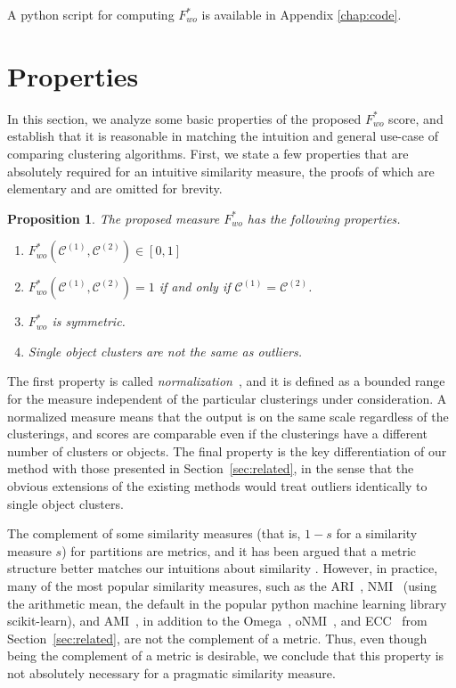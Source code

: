 \documentclass[review,los,12pt]{ryethesis}
\newtheorem{proposition}[theorem]{Proposition}
\newcommand\cCone{\mathcal{C}^{(1)}}
\newcommand\cCtwo{\mathcal{C}^{(2)}}
\begin{document}
A python script for computing $F^*_{wo}$ is available in Appendix \ref{chap:code}.

\section{Properties}
In this section, we analyze some basic properties of the proposed $F^*_{wo}$ score, and establish that it is reasonable in matching the intuition and general use-case of comparing clustering algorithms.
First, we state a few properties that are absolutely required for an intuitive similarity measure, the proofs of which are elementary and are omitted for brevity.

\begin{proposition}
    The proposed measure $F^*_{wo}$ has the following properties.
    \begin{enumerate}
        \item $F^*_{wo}(\cCone, \cCtwo) \in [0,1]$
        \item $F^*_{wo}(\cCone, \cCtwo) = 1$ if and only if $\cCone = \cCtwo$.
        \item $F^*_{wo}$ is symmetric.
        \item Single object clusters are not the same as outliers.
    \end{enumerate}
\end{proposition}

The first property is called \textit{normalization}~\cite{ami}, and it is defined as a bounded range for the measure independent of the particular clusterings under consideration.
A normalized measure means that the output is on the same scale regardless of the clusterings, and scores are comparable even if the clusterings have a different number of clusters or objects.
The final property is the key differentiation of our method with those presented in Section~\ref{sec:related}, in the sense that the obvious extensions of the existing methods would treat outliers identically to single object clusters.

The complement of some similarity measures (that is, $1 - s$ for a similarity measure $s$) for partitions are metrics, and it has been argued that a metric structure better matches our intuitions about similarity \cite{vi}.
However, in practice, many of the most popular similarity measures, such as the ARI~\cite{ari}, NMI~\cite{nmi} (using the arithmetic mean, the default in the popular python machine learning library scikit-learn), and AMI~\cite{ami}, in addition to the Omega~\cite{omega}, oNMI~\cite{onmi}, and ECC~\cite{ecc} from Section~\ref{sec:related}, are not the complement of a metric.
Thus, even though being the complement of a metric is desirable, we conclude that this property is not absolutely necessary for a pragmatic similarity measure.
\end{document}
